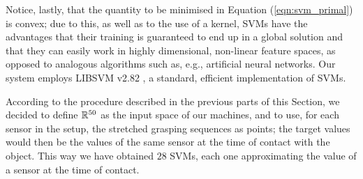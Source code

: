 Notice, lastly, that the quantity to be minimised in Equation
(\ref{eqn:svm_primal}) is convex; due to this, as well as to the use
of a kernel, SVMs have the advantages that their training is
guaranteed to end up in a global solution and that they can easily
work in highly dimensional, non-linear feature spaces, as opposed to
analogous algorithms such as, e.g., artificial neural networks. Our
system employs LIBSVM v2.82 \cite{ChangL01}, a standard, efficient
implementation of SVMs.

According to the procedure described in the previous parts of this
Section, we decided to define $\mathbb{R}^{50}$ as the input space of our
machines, and to use, for each sensor in the setup, the stretched
grasping sequences as points; the target values would then be the
values of the same sensor at the time of contact with the object. This
way we have obtained $28$ SVMs, each one approximating the value of a
sensor at the time of contact.
